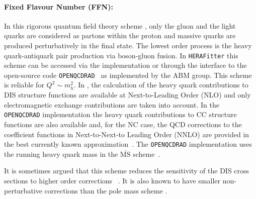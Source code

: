 \paragraph{Fixed Flavour Number (FFN)\rm:\\} 
In this rigorous quantum field theory scheme \cite{Laenen:1992, Laenen:1993, Riem:1995}, 
only the gluon and the light quarks are considered
as partons within the proton and massive 
quarks are produced perturbatively in the final state.
The lowest order process is
the heavy quark-antiquark pair production via boson-gluon fusion.
In \texttt{HERA}\texttt{Fitter} this scheme can be accessed via the 
\qcdnum implementation or through the interface to the open-source code \texttt{OPENQCDRAD}~\cite{openqcdrad:page} as implemented by the ABM group.
This scheme is reliable for $Q^2 \sim m_h^2$.
In \qcdnum, the calculation of the heavy quark contributions to DIS structure functions
are available at Next-to-Leading Order (NLO) and only electromagnetic exchange contributions are taken into account. 
In the \texttt{OPEN}\texttt{QCDRAD} implementation the heavy quark contributions to CC structure functions are also available 
and, for the NC case, the QCD corrections to the coefficient functions in Next-to-Next-to Leading Order (NNLO)
are provided in the best currently known approximation~\cite{SMoch:npb864}.
The  \texttt{OPENQCDRAD} implementation uses the running heavy quark mass in the $\overline{\text{MS}}$ scheme~\cite{Alekhin:runm}.

It is sometimes argued that this scheme reduces the sensitivity of the DIS cross sections to higher order corrections ~\cite{SMoch:npb864}. It is also known to have smaller non-perturbative corrections than the pole mass scheme 
\cite{Beneke:1998ui}.

